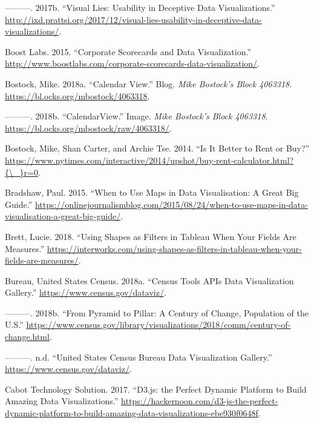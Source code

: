 \documentclass[]{book}
\begin{document}
\leavevmode\hypertarget{ref-study_asks}{}%
---------. 2017b. ``Visual Lies: Usability in Deceptive Data Visualizations.'' \url{http://ixd.prattsi.org/2017/12/visual-lies-usability-in-deceptive-data-visualizations/}.

\leavevmode\hypertarget{ref-SCORECARDS}{}%
Boost Labs. 2015. ``Corporate Scorecards and Data Visualization.'' \url{http://www.boostlabs.com/corporate-scorecards-data-visualization/}.

\leavevmode\hypertarget{ref-Calendar_Layout}{}%
Bostock, Mike. 2018a. ``Calendar View.'' Blog. \emph{Mike Bostock's Block 4063318}. \url{https://bl.ocks.org/mbostock/4063318}.

\leavevmode\hypertarget{ref-CalendarView}{}%
---------. 2018b. ``CalendarView.'' Image. \emph{Mike Bostock's Block 4063318}. \url{https://bl.ocks.org/mbostock/raw/4063318/}.

\leavevmode\hypertarget{ref-rent_or_buy}{}%
Bostock, Mike, Shan Carter, and Archie Tse. 2014. ``Is It Better to Rent or Buy?'' \href{https://www.nytimes.com/interactive/2014/upshot/buy-rent-calculator.html?\%7B/_\%7Dr=0}{https://www.nytimes.com/interactive/2014/upshot/buy-rent-calculator.html?\{\textbackslash{}\_\}r=0}.

\leavevmode\hypertarget{ref-Bradshaw}{}%
Bradshaw, Paul. 2015. ``When to Use Maps in Data Visualisation: A Great Big Guide.'' \url{https://onlinejournalismblog.com/2015/08/24/when-to-use-maps-in-data-visualisation-a-great-big-guide/}.

\leavevmode\hypertarget{ref-measures}{}%
Brett, Lucie. 2018. ``Using Shapes as Filters in Tableau When Your Fields Are Measures.'' \url{https://interworks.com/using-shapes-as-filters-in-tableau-when-your-fields-are-measures/}.

\leavevmode\hypertarget{ref-CensusDataViz}{}%
Bureau, United States Census. 2018a. ``Census Tools APIs Data Visualization Gallery.'' \url{https://www.census.gov/dataviz/}.

\leavevmode\hypertarget{ref-population_pyramid}{}%
---------. 2018b. ``From Pyramid to Pillar: A Century of Change, Population of the U.S.'' \url{https://www.census.gov/library/visualizations/2018/comm/century-of-change.html}.

\leavevmode\hypertarget{ref-census_viz}{}%
---------. n.d. ``United States Census Bureau Data Visualization Gallery.'' \url{https://www.census.gov/dataviz/}.

\leavevmode\hypertarget{ref-d3_interactive_viz}{}%
Cabot Technology Solution. 2017. ``D3.js: the Perfect Dynamic Platform to Build Amazing Data Visualizations.'' \url{https://hackernoon.com/d3-js-the-perfect-dynamic-platform-to-build-amazing-data-visualizations-ebe930f0648f}.
\end{document}

